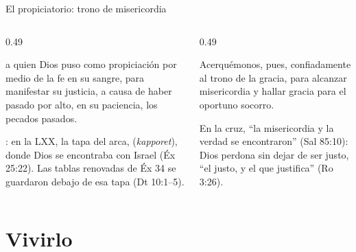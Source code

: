 \begin{frame}{El propiciatorio: trono de misericordia}
\begin{columns}[t,onlytextwidth]
\begin{column}{0.49\textwidth}
\begin{cita}a quien Dios puso como propiciación por medio de la fe en su sangre, para manifestar su justicia, a causa de haber pasado por alto, en su paciencia, los pecados pasados.\end{cita}
\scriptsize{}: en la LXX, la tapa del arca,  (\emph{kapporet}), donde Dios se encontraba con Israel (Éx 25:22). Las tablas renovadas de Éx 34 se guardaron debajo de esa tapa (Dt 10:1--5).
\end{column}
\begin{column}{0.49\textwidth}
\begin{cita}Acerquémonos, pues, confiadamente al trono de la gracia, para alcanzar misericordia y hallar gracia para el oportuno socorro.\end{cita}
\small En la cruz, ``la misericordia y la verdad se encontraron'' (Sal 85:10): Dios perdona sin dejar de ser justo, ``el justo, y el que justifica'' (Ro 3:26).\par\smallskip
{}
\end{column}
\end{columns}
\end{frame}

\section{Vivirlo}

